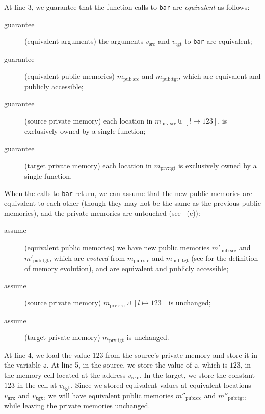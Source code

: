 At line 3, we guarantee that the function calls to \texttt{bar} are
\emph{equivalent} as follows:
\begin{description}
\item[guarantee] (equivalent arguments) 
  the arguments $v_\textrm{src}$ and $v_\textrm{tgt}$ to \texttt{bar} are equivalent; 
\item[guarantee] (equivalent public memories) 
  $m_\textrm{pub:src}$ and $m_\textrm{pub:tgt}$,
  which are equivalent and publicly accessible;
\item[guarantee] (source private memory) 
  each location in $m_\textrm{prv:src} \uplus {[l\mapsto 123]}$,
  is exclusively owned by a single function;
\item[guarantee] (target private memory) 
  each location in $m_\textrm{prv:tgt}$
  is exclusively owned by a single function.
\end{description}
When the calls to \texttt{bar} return,
we can assume that the new public
memories are equivalent to each other (though they may not be the same as the previous public memories), and
the private memories are untouched (see ~(c)):
\begin{description}
\item[assume] (equivalent public memories) we have new public memories $m'_\textrm{pub:src}$ and
  $m'_\textrm{pub:tgt}$, which are \emph{evolved} from $m_\textrm{pub:src}$
  and $m_\textrm{pub:tgt}$ (see  for the definition of memory evolution), and 
  are equivalent and publicly accessible;
\item[assume] (source private memory) $m_\textrm{prv:src} \uplus
  {[l\mapsto 123]}$ is unchanged;
\item[assume] (target private memory) $m_\textrm{prv:tgt}$ is
  unchanged.
\end{description}

At line 4, we load the value $123$ from the source's private memory and
store it in the variable \texttt{a}.  At line 5, in the source, we
store the value of \texttt{a}, which is $123$, in the memory cell located at
the address $v_\texttt{src}$.  In the target, we store the constant
$123$ in the cell at $v_\texttt{tgt}$. Since we stored equivalent
values at equivalent locations $v_\texttt{src}$ and $v_\texttt{tgt}$,
we will have equivalent public memories $m''_\textrm{pub:src}$ and
$m''_\textrm{pub:tgt}$, while leaving the private memories unchanged.

